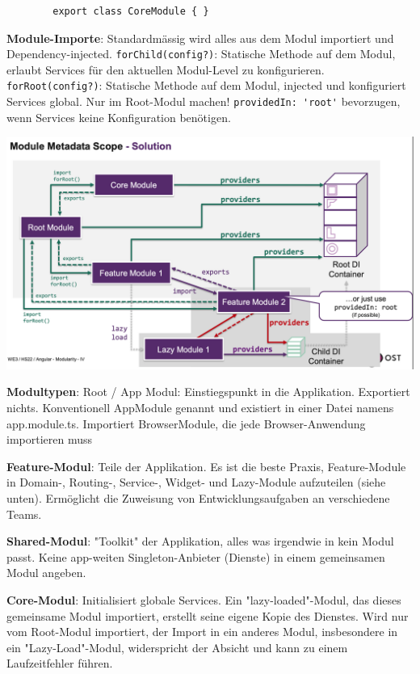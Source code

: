 \documentclass[10pt,landscape]{article}
\begin{document}
\begin{multicols}{3}
\begin{lstlisting}
        export class CoreModule { }
        \end{lstlisting}

        \textbf{Module-Importe}: Standardmässig wird alles aus dem Modul importiert und Dependency-injected.
        \lstinline{forChild(config?)}: Statische Methode auf dem Modul, erlaubt Services für den aktuellen Modul-Level zu konfigurieren.
        \lstinline{forRoot(config?)}: Statische Methode auf dem Modul, injected und konfiguriert Services global.
        Nur im Root-Modul machen!
        \lstinline{providedIn: 'root'} bevorzugen, wenn Services keine Konfiguration benötigen.

        \includegraphics[width=\linewidth]{angular_module_big_picture}

        \textbf{Modultypen}: Root / App Modul: Einstiegspunkt in die Applikation.
        Exportiert nichts.
        Konventionell AppModule genannt und existiert in einer Datei namens app.module.ts.
        Importiert BrowserModule, die jede Browser-Anwendung importieren muss

        \textbf{Feature-Modul}: Teile der Applikation.
        Es ist die beste Praxis, Feature-Module in Domain-, Routing-, Service-, Widget- und Lazy-Module aufzuteilen (siehe unten).
        Ermöglicht die Zuweisung von Entwicklungsaufgaben an verschiedene Teams.

        \textbf{Shared-Modul}: "Toolkit" der Applikation, alles was irgendwie in kein Modul passt.
        Keine app-weiten Singleton-Anbieter (Dienste) in einem gemeinsamen Modul angeben.

        \textbf{Core-Modul}: Initialisiert globale Services.
        Ein "lazy-loaded"-Modul, das dieses gemeinsame Modul importiert, erstellt seine eigene Kopie des Dienstes.
        Wird nur vom Root-Modul importiert, der Import in ein anderes Modul, insbesondere in ein "Lazy-Load"-Modul, widerspricht der Absicht und kann zu einem Laufzeitfehler führen.


\end{multicols}
\end{document}
